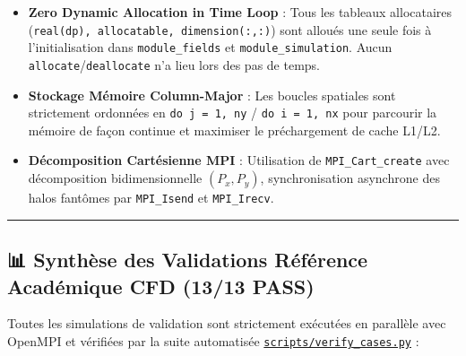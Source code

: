 \documentclass[
  french,
]{article}
\providecommand{\tightlist}{%
  \setlength{\itemsep}{0pt}\setlength{\parskip}{0pt}}
\begin{document}
\begin{itemize}
\tightlist
\item
  \textbf{Zero Dynamic Allocation in Time Loop} : Tous les tableaux
  allocataires (\texttt{real(dp),\ allocatable,\ dimension(:,:)}) sont
  alloués une seule fois à l'initialisation dans \texttt{module\_fields}
  et \texttt{module\_simulation}. Aucun
  \texttt{allocate}/\texttt{deallocate} n'a lieu lors des pas de temps.
\item
  \textbf{Stockage Mémoire Column-Major} : Les boucles spatiales sont
  strictement ordonnées en \texttt{do\ j\ =\ 1,\ ny} /
  \texttt{do\ i\ =\ 1,\ nx} pour parcourir la mémoire de façon continue
  et maximiser le préchargement de cache L1/L2.
\item
  \textbf{Décomposition Cartésienne MPI} : Utilisation de
  \texttt{MPI\_Cart\_create} avec décomposition bidimensionnelle
  \((P_x, P_y)\), synchronisation asynchrone des halos fantômes par
  \texttt{MPI\_Isend} et \texttt{MPI\_Irecv}.
\end{itemize}

\begin{center}\rule{0.5\linewidth}{0.5pt}\end{center}

\subsection{📊 Synthèse des Validations Référence Académique CFD (13/13
PASS)}\label{synthuxe8se-des-validations-ruxe9fuxe9rence-acaduxe9mique-cfd-1313-pass}

Toutes les simulations de validation sont strictement exécutées en
parallèle avec OpenMPI et vérifiées par la suite automatisée
\href{scripts/verify_cases.py}{\texttt{scripts/verify\_cases.py}} :
\end{document}
